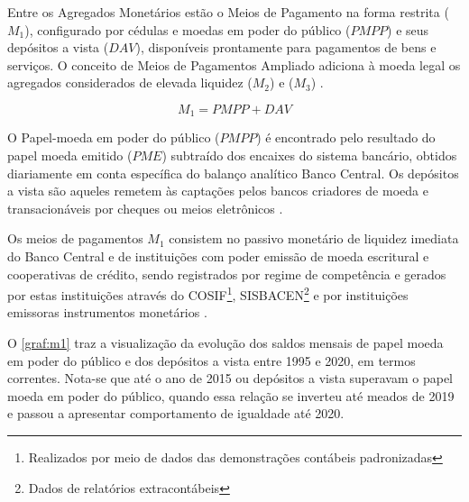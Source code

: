 \documentclass[
  12pt,
  12pt,
  openright,
  oneside,
  a4paper,
  chapter=TITLE,
  section=TITLE,
  subsection=TITLE,
  subsubsection=TITLE,
  english,
  portugues,
  sumario=tradicional]{abntex2}
\begin{document}
Entre os Agregados Monetários estão o Meios de Pagamento na forma restrita (\(M_1\)), configurado por cédulas e moedas em poder do público (\(PMPP\)) e seus depósitos a vista (\(DAV\)), disponíveis prontamente para pagamentos de bens e serviços. O conceito de Meios de Pagamentos Ampliado adiciona à moeda legal os agregados considerados de elevada liquidez (\(M_2\)) e (\(M_3\)) \cite{bcb:2019, sgs:mpa}.

\begin{equation}
M_1 = PMPP + DAV
\end{equation}

O Papel-moeda em poder do público (\(PMPP\)) é encontrado pelo resultado do papel moeda emitido (\(PME\)) subtraído dos encaixes do sistema bancário, obtidos diariamente em conta específica do balanço analítico Banco Central. Os depósitos a vista são aqueles remetem às captações pelos bancos criadores de moeda e transacionáveis por cheques ou meios eletrônicos \cite{sgs:m1}.

Os meios de pagamentos \(M_1\) consistem no passivo monetário de liquidez imediata do Banco Central e de instituições com poder emissão de moeda escritural e cooperativas de crédito, sendo registrados por regime de competência e gerados por estas instituições através do COSIF\footnote{ Realizados por meio de dados das demonstrações contábeis padronizadas}, SISBACEN\footnote{Dados de relatórios extracontábeis} e por instituições emissoras instrumentos monetários \cite{sgs:m1, sgs:mpa}.

O \autoref{graf:m1} traz a visualização da evolução dos saldos mensais de papel moeda em poder do público e dos depósitos a vista entre 1995 e 2020, em termos correntes. Nota-se que até o ano de 2015 ou depósitos a vista superavam o papel moeda em poder do público, quando essa relação se inverteu até meados de 2019 e passou a apresentar comportamento de igualdade até 2020.
\end{document}
